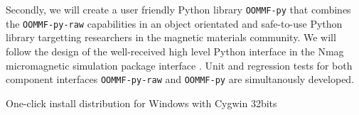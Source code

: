 \begin{workpackage}[id=component-architecture,wphases=0-48!.5,
  title=Component Architecture,lead=UV,
  PSRM=64,UVRM=8,SARM=16, USHRM=4, USORM=6, UBRM=12]
\begin{tasklist}
\begin{task}[lead=USO,id=oommf-python-interface,title=Python interface for OOMMF micromagnetic simulation library,PM=6,partners={SA}]
  Secondly, we will create a user friendly Python library
  \texttt{OOMMF-py} that combines the \texttt{OOMMF-py-raw}
  capabilities in an object orientated and safe-to-use Python library
  targetting researchers in the magnetic materials community. We will
  follow the design of the well-received high level Python interface
  in the Nmag micromagnetic simulation package \cite{Fischbacher2007a}
  interface \cite{Nmag-url}. Unit and regression tests for both
  component interfaces \texttt{OOMMF-py-raw} and \texttt{OOMMF-py} are
  simultanously developed.





\end{task}





\end{tasklist}

  \begin{wpdelivs}
    \begin{wpdeliv}[due=6,id=portability-cygwin32,dissem=PU,nature=OTHER]
      {One-click install \Sage distribution for Windows with Cygwin 32bits}
    \end{wpdeliv}%



\end{wpdelivs}
\end{workpackage}
